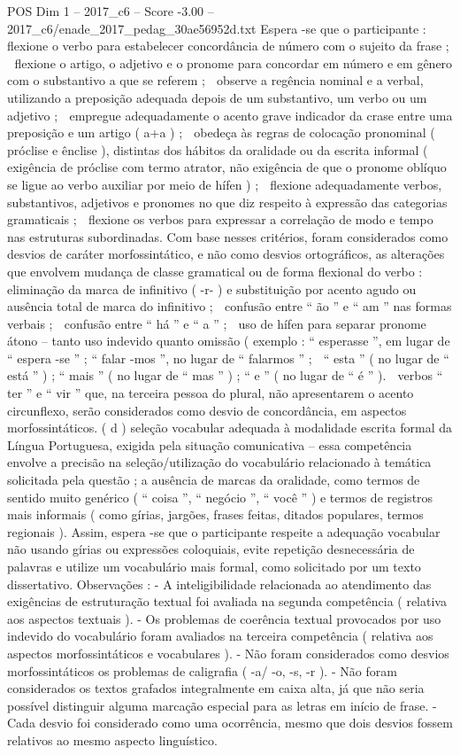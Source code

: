 \begin{textsample}{POS Dim 1 – 2017\_c6 – Score -3.00 – 2017\_c6/enade\_2017\_pedag\_30ae56952d.txt}
Espera -se que o participante :  flexione o verbo para estabelecer concordância de número com o sujeito da frase ;  flexione o artigo, o adjetivo e o pronome para concordar em número e em gênero com o substantivo a que se referem ;  observe a regência nominal e a verbal, utilizando a preposição adequada depois de um substantivo, um verbo ou um adjetivo ;  empregue adequadamente o acento grave indicador da crase entre uma preposição e um artigo ( a+a ) ;  obedeça às regras de colocação pronominal ( próclise e ênclise ), distintas dos hábitos da oralidade ou da escrita informal ( exigência de próclise com termo atrator, não exigência de que o pronome oblíquo se ligue ao verbo auxiliar por meio de hífen ) ;  flexione adequadamente verbos, substantivos, adjetivos e pronomes no que diz respeito à expressão das categorias gramaticais ;  flexione os verbos para expressar a correlação de modo e tempo nas estruturas subordinadas.
Com base nesses critérios, foram considerados como desvios de caráter morfossintático, e não como desvios ortográficos, as alterações que envolvem mudança de classe gramatical ou de forma flexional do verbo :  eliminação da marca de infinitivo ( -r- ) e substituição por acento agudo ou ausência total de marca do infinitivo ;  confusão entre “ ão ” e “ am ” nas formas verbais ;  confusão entre “ há ” e “ a ” ;  uso de hífen para separar pronome átono – tanto uso indevido quanto omissão ( exemplo : “ esperasse ”, em lugar de “ espera -se ” ; “ falar -mos ”, no lugar de “ falarmos ” ;  “ esta ” ( no lugar de “ está ” ) ; “ mais ” ( no lugar de “ mas ” ) ; “ e ” ( no lugar de “ é ” ).  verbos “ ter ” e “ vir ” que, na terceira pessoa do plural, não apresentarem o acento circunflexo, serão considerados como desvio de concordância, em aspectos morfossintáticos. ( d ) seleção vocabular adequada à modalidade escrita formal da Língua Portuguesa, exigida pela situação comunicativa – essa competência envolve a precisão na seleção/utilização do vocabulário relacionado à temática solicitada pela questão ; a ausência de marcas da oralidade, como termos de sentido muito genérico ( “ coisa ”, “ negócio ”, “ você ” ) e termos de registros mais informais ( como gírias, jargões, frases feitas, ditados populares, termos regionais ).
Assim, espera -se que o participante respeite a adequação vocabular não usando gírias ou expressões coloquiais, evite repetição desnecessária de palavras e utilize um vocabulário mais formal, como solicitado por um texto dissertativo.
Observações : - A inteligibilidade relacionada ao atendimento das exigências de estruturação textual foi avaliada na segunda competência ( relativa aos aspectos textuais ). - Os problemas de coerência textual provocados por uso indevido do vocabulário foram avaliados na terceira competência ( relativa aos aspectos morfossintáticos e vocabulares ). - Não foram considerados como desvios morfossintáticos os problemas de caligrafia ( -a/ -o, -s, -r ). - Não foram considerados os textos grafados integralmente em caixa alta, já que não seria possível distinguir alguma marcação especial para as letras em início de frase. - Cada desvio foi considerado como uma ocorrência, mesmo que dois desvios fossem relativos ao mesmo aspecto linguístico.

\end{textsample}
